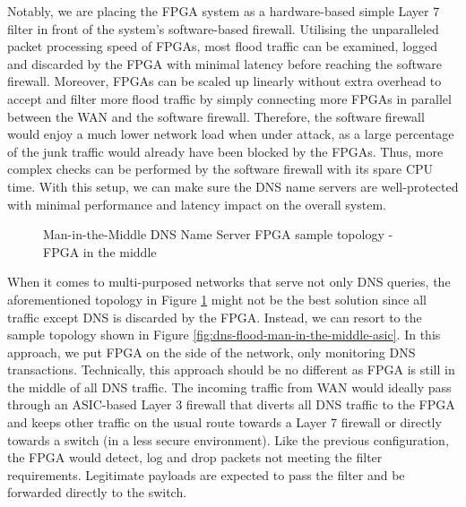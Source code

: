 \documentclass[a4paper]{report}
\begin{document}
Notably, we are placing the FPGA system as a hardware-based simple Layer 7 filter in front of the system's software-based firewall. Utilising the unparalleled packet processing speed of FPGAs, most flood traffic can be examined, logged and discarded by the FPGA with minimal latency before reaching the software firewall. Moreover, FPGAs can be scaled up linearly without extra overhead to accept and filter more flood traffic by simply connecting more FPGAs in parallel between the WAN and the software firewall. Therefore, the software firewall would enjoy a much lower network load when under attack, as a large percentage of the junk traffic would already have been blocked by the FPGAs. Thus, more complex checks can be performed by the software firewall with its spare CPU time. With this setup, we can make sure the DNS name servers are well-protected with minimal performance and latency impact on the overall system.

\begin{figure}[H]
  \caption{Man-in-the-Middle DNS Name Server FPGA sample topology - FPGA in the middle}
  \label{fig:dns-flood-man-in-the-middle}
\end{figure}

When it comes to multi-purposed networks that serve not only DNS queries, the aforementioned topology in Figure \ref{fig:dns-flood-man-in-the-middle} might not be the best solution since all traffic except DNS is discarded by the FPGA. Instead, we can resort to the sample topology shown in Figure \ref{fig:dns-flood-man-in-the-middle-asic}. In this approach, we put FPGA on the side of the network, only monitoring DNS transactions. Technically, this approach should be no different as FPGA is still in the middle of all DNS traffic. The incoming traffic from WAN would ideally pass through an ASIC-based Layer 3 firewall that diverts all DNS traffic to the FPGA and keeps other traffic on the usual route towards a Layer 7 firewall or directly towards a switch (in a less secure environment). Like the previous configuration, the FPGA would detect, log and drop packets not meeting the filter requirements. Legitimate payloads are expected to pass the filter and be forwarded directly to the switch.
\end{document}
